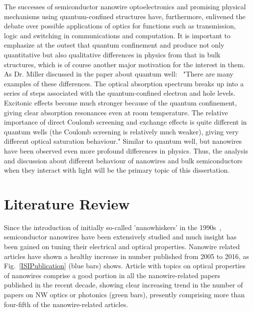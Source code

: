The successes of semiconductor nanowire optoelectronics and promising physical
mechanisms using quantum-confined structures have, furthermore, enlivened the
debate over possible applications of optics for functions such as transmission,
logic and switching in communications and computation. It is important to
emphasize at the outset that quantum confinement and produce not only
quantitative but also qualitative differences in physics from that in bulk
structures, which is of course another major motivation for the interest in
them. As Dr. Miller discussed in the paper about quantum
well:~\cite{schmitt1989linear} "There are many examples of these differences.
The optical absorption spectrum breaks up into a series of steps associated
with the quantum-confined electron and hole levels. Excitonic effects become
much stronger because of the quantum confinement, giving clear absorption
resonances even at room temperature. The relative importance of direct Coulomb
screening and exchange effects is quite different in quantum wells (the Coulomb
screening is relatively much weaker), giving very different optical saturation
behaviour." Similar to quantum well, but nanowires have been observed even more
profound differences in physics. Thus, the analysis and discussion about
different behaviour of nanowires and bulk semiconductors when they interact
with light will be the primary topic of this dissertation.


\section{Literature Review} \label{sec:intro_LR}

Since the introduction of initially so-called 'nanowhiskers' in the
1990s~\cite{yazawa1991heteroepitaxial}, semiconductor nanowires have been
extensively studied and much insight has been gained on tuning their electrical
and optical properties. Nanowire related articles have shown a healthy increase
in number published from 2005 to 2016, as Fig.~\ref{ISIPublication} (blue bars)
shows. Article with topics on optical properties of nanowires comprise a good
portion in all the nanowire-related papers published in the recent decade,
showing clear increasing trend in the number of papers on NW optics or
photonics (green bars), presently comprising more than four-fifth of the
nanowire-related articles.

